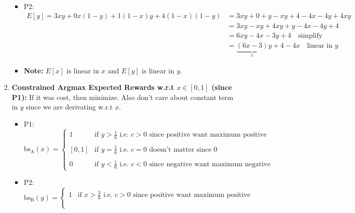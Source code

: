 \begin{example}
\begin{enumerate}
\begin{enumerate}
\begin{itemize}
\begin{align*}
                \end{align*}
                \item P2:
                \begin{align*}
                    E[y] = 3xy + 0x(1-y) + 1(1-x)y + 4(1-x)(1-y) &= 3xy + 0 + y - xy + 4 - 4x - 4y + 4xy \\
                    &= 3xy - xy + 4xy + y - 4x - 4y + 4 \\
                    &= 6xy - 4x - 3y + 4 \quad \text{simplify} \\
                    &= \underbrace{(6x - 3)}_{c}y + 4 - 4x \quad \text{linear in $y$}
                \end{align*}
                \item \textbf{Note:} $E[x]$ is linear in $x$ and $E[y]$ is linear in $y$.
            \end{itemize}
            \item \textbf{Constrained Argmax Expected Rewards w.r.t $x \in [0,1]$ (since P1):} If it was cost, then minimize. Also don't care about constant term in $y$ since we are derivating w.r.t $x$.
            \begin{itemize}
                \item P1: 
                \begin{equation*}
                    \text{bs}_{\text{A}}(x) = \begin{cases}
                        1 & \text{if } y > \frac{1}{6} \text{ i.e. } c > 0 \text{ since positive want maximum positive}\\
                        & \\
                        [0,1] & \text{if } y=\frac{1}{6} \text{ i.e. }c = 0 \text{ doesn't matter since 0} \\
                        & \\
                        0 & \text{if } y < \frac{1}{6} \text{ i.e. } c < 0 \text{ since negative want maximum negative}
                    \end{cases}
                \end{equation*}
                \item P2:
                \begin{equation*}
                    \text{bs}_{\text{B}}(y) = \begin{cases}
                        1 & \text{if } x > \frac{3}{6} \text{ i.e. } c > 0 \text{ since positive want maximum positive}\\
                        & \\

\end{cases}
\end{equation*}
\end{itemize}
\end{enumerate}
\end{enumerate}
\end{example}
